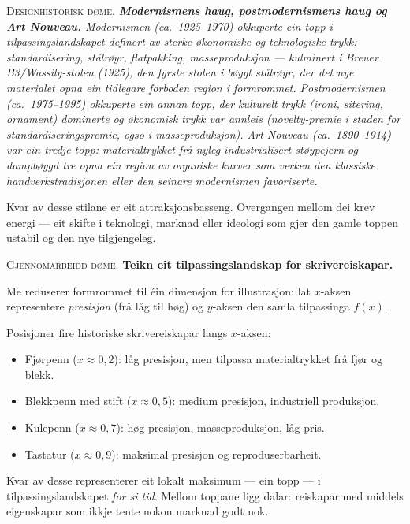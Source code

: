\documentclass[10pt]{book}
\theoremstyle{definition}
\theoremstyle{plain}
\theoremstyle{remark}
\newenvironment{designhistorie}%
  {\medskip\noindent\textsc{Designhistorisk d\o me.}\itshape\enspace}%
  {\medskip}
\newenvironment{gjennomgang}%
  {\medskip\noindent\textsc{Gjennomarbeidd d\o me.}\enspace}%
  {\medskip}
\begin{document}
\begin{designhistorie}
\textbf{Modernismens haug, postmodernismens haug og Art Nouveau.} Modernismen (ca.~1925--1970) okkuperte ein topp i tilpassingslandskapet definert av sterke \o konomiske og teknologiske trykk: standardisering, st\aa lr\o yr, flatpakking, masseproduksjon --- kulminert i Breuer B3/Wassily-stolen (1925), den fyrste stolen i b\o ygt st\aa lr\o yr, der det nye materialet opna ein tidlegare forboden region i formrommet. Postmodernismen (ca.~1975--1995) okkuperte ein annan topp, der kulturelt trykk (ironi, sitering, ornament) dominerte og \o konomisk trykk var annleis (novelty-premie i staden for standardiseringspremie, ogso i masseproduksjon). Art Nouveau (ca.~1890--1914) var ein tredje topp: materialtrykket fr\aa{} nyleg industrialisert st\o ypejern og dampb\o ygd tre opna ein region av organiske kurver som verken den klassiske handverkstradisjonen eller den seinare modernismen favoriserte.

Kvar av desse stilane er eit attraksjonsbasseng. Overgangen mellom dei krev energi --- eit skifte i teknologi, marknad eller ideologi som gjer den gamle toppen ustabil og den nye tilgjengeleg.
\end{designhistorie}

\begin{gjennomgang}
\textbf{Teikn eit tilpassingslandskap for skrivereiskapar.}

Me reduserer formrommet til \'ein dimensjon for illustrasjon: lat $x$-aksen representere \emph{presisjon} (fr\aa{} l\aa g til h\o g) og $y$-aksen den samla tilpassinga $f(x)$.

Posisjoner fire historiske skrivereiskapar langs $x$-aksen:
\begin{itemize}[nosep]
  \item Fj\o rpenn ($x \approx 0{,}2$): l\aa g presisjon, men tilpassa materialtrykket fr\aa{} fj\o r og blekk.
  \item Blekkpenn med stift ($x \approx 0{,}5$): medium presisjon, industriell produksjon.
  \item Kulepenn ($x \approx 0{,}7$): h\o g presisjon, masseproduksjon, l\aa g pris.
  \item Tastatur ($x \approx 0{,}9$): maksimal presisjon og reproduserbarheit.
\end{itemize}

Kvar av desse representerer eit lokalt maksimum --- ein topp --- i tilpassingslandskapet \emph{for si tid}. Mellom toppane ligg dalar: reiskapar med middels eigenskapar som ikkje tente nokon marknad godt nok.
\end{gjennomgang}
\end{document}
